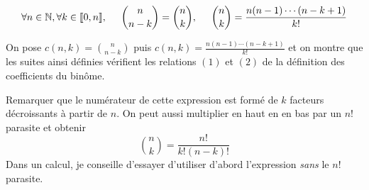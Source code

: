 \begin{demo}
\end{demo}
\begin{prop}
\begin{displaymath}
  \forall n\in \mathbb{N}, \forall k\in \llbracket 0, n\rrbracket,\hspace{0.5cm}
  \binom{n}{n-k}=\binom{n}{k}, \hspace{0.5cm}
  \binom{n}{k} = \frac{n(n-1)\cdots(n-k+1)}{k!}
\end{displaymath}
\end{prop}
\begin{demo}
  On pose $c(n,k)=\binom{n}{n-k}$ puis $c(n,k)= \frac{n(n-1)\cdots(n-k+1)}{k!}$ et on montre que les suites ainsi définies vérifient les relations $(1)$ et $(2)$ de la définition des coefficients du binôme.
\end{demo}
Remarquer que le numérateur de cette expression est formé de $k$ facteurs décroissants à partir de $n$. On peut aussi multiplier en haut en en bas par un $n!$ parasite et obtenir
\begin{displaymath}
  \binom{n}{k} = \frac{n!}{k!(n-k)!}
\end{displaymath}
Dans un calcul, je conseille d'essayer d'utiliser d'abord l'expression \emph{sans} le $n!$ parasite.

